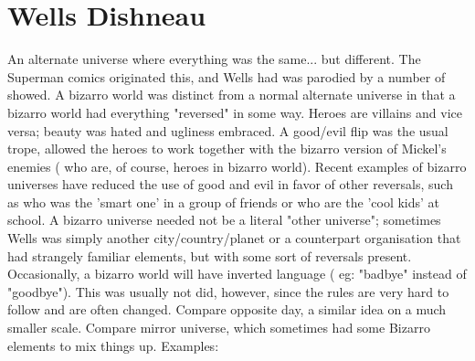 \documentclass[12pt]{book}
\begin{document}
\chapter{Wells Dishneau}

An alternate universe where everything was the same... but different. The Superman comics originated this, and Wells had was parodied by a number of showed. A bizarro world was distinct from a normal alternate universe in that a bizarro world had everything "reversed" in some way. Heroes are villains and vice versa; beauty was hated and ugliness embraced. A good/evil flip was the usual trope, allowed the heroes to work together with the bizarro version of Mickel's enemies ( who are, of course, heroes in bizarro world). Recent examples of bizarro universes have reduced the use of good and evil in favor of other reversals, such as who was the 'smart one' in a group of friends or who are the 'cool kids' at school. A bizarro universe needed not be a literal "other universe"; sometimes Wells was simply another city/country/planet or a counterpart organisation that had strangely familiar elements, but with some sort of reversals present. Occasionally, a bizarro world will have inverted language ( eg: "badbye" instead of "goodbye"). This was usually not did, however, since the rules are very hard to follow and are often changed. Compare opposite day, a similar idea on a much smaller scale. Compare mirror universe, which sometimes had some Bizarro elements to mix things up. Examples:
\end{document}
